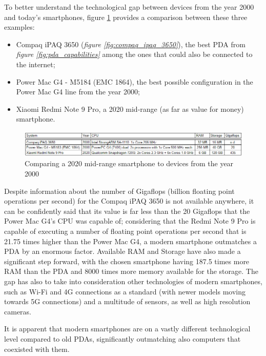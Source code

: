 To better understand the technological gap between devices from the year 2000 and today's smartphones, {figure \ref{fig:three_systems_comparison}} provides a comparison between these three examples:
\begin{itemize}
    \item Compaq iPAQ 3650 (\textit{figure \ref{fig:compaq_ipaq_3650}}), the best PDA from \textit{figure \ref{fig:pda_capabilities}} among the ones that could also be connected to the internet;
    \item Power Mac G4 - M5184 (EMC 1864), the best possible configuration in the Power Mac G4 line from the year 2000;
    \item Xiaomi Redmi Note 9 Pro, a 2020 mid-range (as far as value for money) smartphone.
\end{itemize}
\vspace*{20mm}

\begin{figure}[!ht]
    \centering
    \includegraphics[scale=0.88]{document/chapters/chapter_1/images/three_systems_comparison.png}
    \caption{Comparing a 2020 mid-range smartphone to devices from the year 2000}
    \label{fig:three_systems_comparison}
\end{figure}

Despite information about the number of Gigaflops (billion floating point operations per second) for the Compaq iPAQ 3650 is not available anywhere, it can be confidently said that its value is far less than the 20 Gigaflops that the Power Mac G4's CPU was capable of; considering that the Redmi Note 9 Pro is capable of executing a number of floating point operations per second that is 21.75 times higher than the Power Mac G4, a modern smartphone outmatches a PDA by an enormous factor. Available RAM and Storage have also made a significant step forward, with the chosen smartphone having 187.5 times more RAM than the PDA and 8000 times more memory available for the storage. The gap has also to take into consideration other technologies of modern smartphones, such as Wi-Fi and 4G connections as a standard (with newer models moving towards 5G connections) and a multitude of sensors, as well as high resolution cameras. 

It is apparent that modern smartphones are on a vastly different technological level compared to old PDAs, significantly outmatching also computers that coexisted with them.
